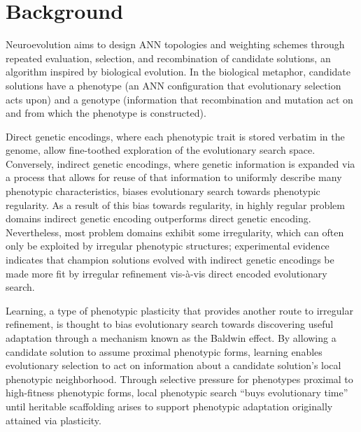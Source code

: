 \section{Background}

Neuroevolution aims to design ANN topologies and weighting schemes through repeated evaluation, selection, and recombination of candidate solutions, an algorithm inspired by biological evolution.
In the biological metaphor, candidate solutions have a phenotype (an ANN configuration that evolutionary selection acts upon) and a genotype (information that recombination and mutation act on and from which the phenotype is constructed).

Direct genetic encodings, where each phenotypic trait is stored verbatim in the genome, allow fine-toothed exploration of the evolutionary search space.
Conversely, indirect genetic encodings, where genetic information is expanded via a process that allows for reuse of that information to uniformly describe many phenotypic characteristics, biases evolutionary search towards phenotypic regularity.\autocite{Clune2011OnRegularity}
As a result of this bias towards regularity, in highly regular problem domains indirect genetic encoding outperforms direct genetic encoding.\autocite{Clune2011OnRegularity}
Nevertheless, most problem domains exhibit some irregularity, which can often only be exploited by irregular phenotypic structures; experimental evidence indicates that champion solutions evolved with indirect genetic encodings be made more fit by irregular refinement vis-\`a-vis direct encoded evolutionary search.\autocite{Clune2011OnRegularity}

Learning, a type of phenotypic plasticity that provides another route to irregular refinement,\autocite{Clune2011OnRegularity} is thought to bias evolutionary search towards discovering useful adaptation through a mechanism known as the Baldwin effect.\autocite{Downing2010TheNetworks}
By allowing a candidate solution to assume proximal phenotypic forms, learning enables evolutionary selection to act on information about a candidate solution's local phenotypic neighborhood.
Through selective pressure for phenotypes proximal to high-fitness phenotypic forms, local phenotypic search ``buys evolutionary time'' until heritable scaffolding arises to support phenotypic adaptation originally attained via plasticity.\autocite{Downing2010TheNetworks}
